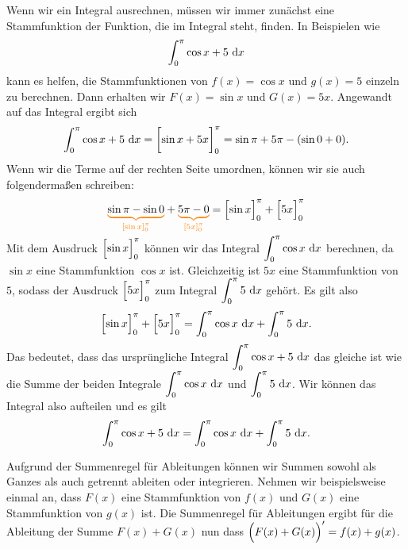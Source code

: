 \documentclass[../../main.tex]{subfiles}
\begin{document}
\begin{example}{}
    Wenn wir ein Integral
    ausrechnen, müssen wir immer zunächst eine Stammfunktion der Funktion, die im Integral steht, finden. In Beispielen wie
    \[\int_0^\pi\cos x+5\mathop{}\mathrm{d} x\]
    kann es helfen, die Stammfunktionen von $f(x)=\cos x$ und $g(x)=5$ einzeln zu berechnen. Dann erhalten wir 
    $F(x)=\sin x$ und $G(x)=5x$. Angewandt auf das Integral ergibt sich
    \[\int_0^\pi\cos x+5\mathop{}\mathrm{d} x=\biggl[\sin x+5x\biggr]_0^\pi=\sin\pi+5\pi-(\sin 0+0).\]
    Wenn wir die Terme auf der rechten Seite umordnen, können wir sie auch folgendermaßen schreiben:
    \[\colorbrace{\sin\pi-\sin 0}{[\sin x]_0^\pi}+\colorbrace{5\pi-0}{[5x]_0^\pi}=\Bigl[\sin x\Bigr]_0^\pi+\Bigl[5x\Bigr]_0^\pi\]
    Mit dem Ausdruck $\displaystyle \Bigl[\sin x\Bigr]_0^\pi$ können wir das Integral $\displaystyle \int_0^\pi\cos x\mathop{}\mathrm{d} x$
    berechnen, da $\sin x$ eine Stammfunktion $\cos x$ ist. Gleichzeitig ist $5x$ eine Stammfunktion von $5$, sodass
    der Ausdruck $\displaystyle \Bigl[5x\Bigr]_0^\pi$ zum Integral $\displaystyle \int_0^\pi 5\mathop{}\mathrm{d} x$ gehört. Es gilt
    also
    \[\Bigl[\sin x\Bigr]_0^\pi+\Bigl[5x\Bigr]_0^\pi=\int_0^\pi\cos x\mathop{}\mathrm{d} x+\int_0^\pi 5\mathop{}\mathrm{d} x.\]
    Das bedeutet, dass das ursprüngliche Integral $\displaystyle \int_0^\pi\cos x+5\mathop{}\mathrm{d} x$ das gleiche ist wie die Summe
    der beiden Integrale $\displaystyle \int_0^\pi\cos x\mathop{}\mathrm{d} x$ und $\displaystyle \int_0^\pi 5\mathop{}\mathrm{d} x$.
    Wir können das Integral also aufteilen und es gilt
    \[\int_0^\pi\cos x+5\mathop{}\mathrm{d} x=\int_0^\pi\cos x\mathop{}\mathrm{d} x+\int_0^\pi 5\mathop{}\mathrm{d} x.\]
\end{example}
Aufgrund der Summenregel für Ableitungen können wir Summen sowohl als Ganzes als auch getrennt ableiten oder integrieren.
Nehmen wir beispielsweise einmal an, dass $F(x)$ eine Stammfunktion von $f(x)$ und
$G(x)$ eine Stammfunktion von $g(x)$ ist. Die Summenregel für Ableitungen ergibt für die Ableitung der Summe $F(x)+G(x)$ 
nun dass $\Bigl(F(x)+G(x)\Bigr)'=f(x)+g(x)$. 
\end{document}
